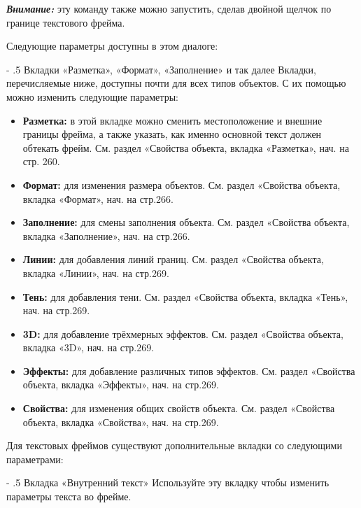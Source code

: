 \documentclass[a4paper,10pt]{article}
\makeatletter
\renewcommand\paragraph{%
   \@startsection{paragraph}{4}{0mm}%
      {-\baselineskip}%
      {.5\baselineskip}%
      {\normalfont\normalsize\bfseries}}
\makeatother
\begin{document}
\begin{mdframed}[backgroundcolor=blue!10]
\textbf{\textit{Внимание:}} эту команду также можно запустить, сделав двойной щелчок по  границе текстового фрейма.
\end{mdframed}

Следующие параметры доступны в этом диалоге:

\paragraph{Вкладки «Разметка», «Формат», «Заполнение» и так далее}
Вкладки, перечисляемые ниже, доступны почти для всех типов объектов. С их помощью можно изменить следующие параметры:

\begin{itemize}
 \item \textbf{Разметка:} в этой вкладке можно сменить местоположение и внешние границы фрейма, а также указать, как именно основной текст должен обтекать фрейм. См. раздел «Свойства объекта, вкладка «Разметка», нач. на стр. 260.
 \item \textbf{Формат:} для изменения размера объектов. См. раздел «Свойства объекта, вкладка «Формат», нач. на стр.266.
 \item \textbf{Заполнение:} для смены заполнения объекта. См. раздел «Свойства объекта, вкладка «Заполнение», нач. на стр.266.
 \item \textbf{Линии:} для добавления линий границ. См. раздел «Свойства объекта, вкладка «Линии», нач. на стр.269.
 \item \textbf{Тень:} для добавления тени. См. раздел «Свойства объекта, вкладка «Тень», нач. на стр.269.
 \item \textbf{3D:} для добавление трёхмерных эффектов. См. раздел «Свойства объекта, вкладка «3D», нач. на стр.269.
 \item \textbf{Эффекты:} для добавление различных типов эффектов. См. раздел «Свойства объекта, вкладка «Эффекты», нач. на стр.269.
 \item \textbf{Свойства:} для изменения общих свойств объекта. См. раздел «Свойства объекта, вкладка «Свойства», нач. на стр.269.
\end{itemize}

Для текстовых фреймов существуют дополнительные вкладки со следующими параметрами:

\paragraph{Вкладка «Внутренний текст»}
Используйте эту вкладку чтобы изменить параметры текста во фрейме.
\end{document}
